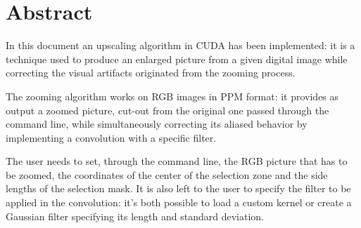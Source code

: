 \section*{Abstract}

In this document an upscaling algorithm in CUDA has been implemented: it is a technique used to produce an enlarged picture from a given digital image while correcting the visual artifacts originated from the zooming process.

The zooming algorithm works on RGB images in PPM format:
it provides as output a zoomed picture, cut-out from the original one passed through the command line, while simultaneously correcting its aliased behavior by implementing a convolution with a specific filter.

The user needs to set, through the command line, the RGB picture that has to be zoomed, the coordinates of the center of the selection zone and the side lengths of the selection mask.
It is also left to the user to specify the filter to be applied in the convolution: it's both possible to load a custom kernel or create a Gaussian filter specifying its length and standard deviation.
